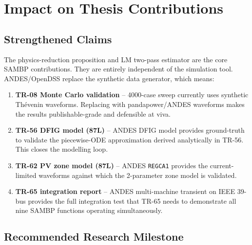 \documentclass[11pt,a4paper]{article}
\begin{document}
\section{Impact on Thesis Contributions}

\subsection{Strengthened Claims}

The physics-reduction proposition and LM two-pass estimator are the
core SAMBP contributions. They are entirely independent of the simulation
tool. ANDES/OpenDSS replace the synthetic data generator, which means:

\begin{enumerate}
\item \textbf{TR-08 Monte Carlo validation} -- 4000-case sweep currently
uses synthetic Th\'evenin waveforms. Replacing with pandapower/ANDES
waveforms makes the results publishable-grade and defensible at viva.

\item \textbf{TR-56 DFIG model (87L)} -- ANDES DFIG model provides
ground-truth to validate the piecewise-ODE approximation derived
analytically in TR-56. This closes the modelling loop.

\item \textbf{TR-62 PV zone model (87L)} -- ANDES \texttt{REGCA1}
provides the current-limited waveforms against which the
2-parameter zone model is validated.

\item \textbf{TR-65 integration report} -- ANDES multi-machine transient
on IEEE 39-bus provides the full integration test that TR-65 needs to
demonstrate all nine SAMBP functions operating simultaneously.
\end{enumerate}

\subsection{Recommended Research Milestone}
\end{document}
